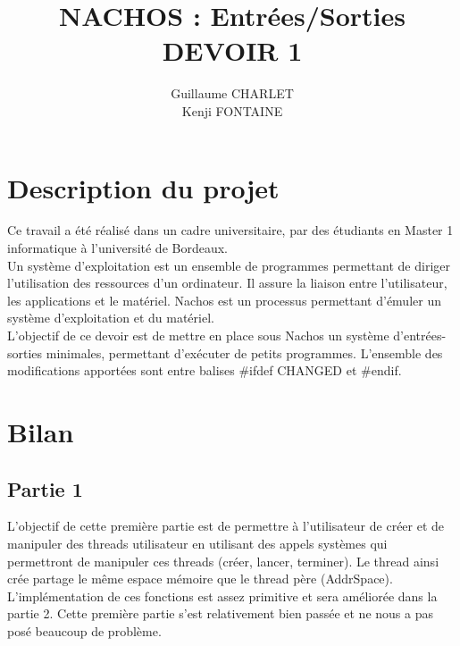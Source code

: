 \documentclass[a4paper]{article}
\title
{
	\LARGE{NACHOS : Entrées/Sorties}
	\HRule \\ [0.5cm]
	\LARGE \textbf{\uppercase{Devoir 1}}
	\HRule \\ [0.5cm]
}
\author{Guillaume CHARLET \\ Kenji FONTAINE}
\begin{document}
\null  %
\nointerlineskip  %
\vfill
\let\snewpage \newpage
\let\newpage \relax
\maketitle
\let \newpage \snewpage
\vfill
\break %


\tableofcontents
\newpage


\section{Description du projet}
Ce travail a été réalisé dans un cadre universitaire,  par des étudiants en
Master 1 informatique à l'université de Bordeaux. \\
Un système d'exploitation est un ensemble de programmes permettant de diriger
l'utilisation des ressources d'un ordinateur. Il assure la liaison entre
l'utilisateur, les applications et le matériel.
Nachos est un processus permettant d'émuler un système d'exploitation et du
matériel. \\
L'objectif de ce devoir est de mettre en place sous Nachos un système
d'entrées-sorties minimales, permettant d'exécuter de petits programmes.
L'ensemble des modifications apportées sont entre balises \#ifdef CHANGED et
\#endif. \\


\section{Bilan}

\subsection{Partie 1}
L'objectif de cette première partie est de permettre à l'utilisateur de créer et
de manipuler des threads utilisateur en utilisant des appels systèmes qui
permettront de manipuler ces threads (créer, lancer, terminer). Le thread ainsi
crée partage le même espace mémoire que le thread père (AddrSpace).
L'implémentation de ces fonctions est assez primitive et sera améliorée dans la
partie 2. Cette première partie s'est relativement bien passée et ne nous a
pas posé beaucoup de problème.
\end{document}
